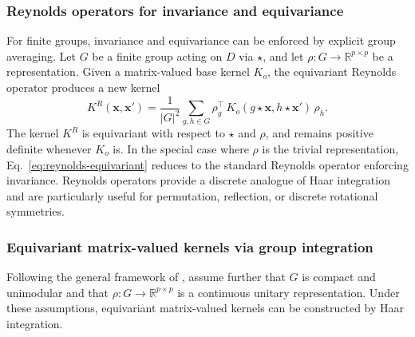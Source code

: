 \documentclass[11pt,a4paper]{article}
\newcommand{\Kbase}{K_o}
\newcommand{\bx}{\boldsymbol{x}}
\begin{document}
\subsubsection{Reynolds operators for invariance and equivariance}\label{subsec:Reynolds}
For finite groups, invariance and equivariance can be enforced by explicit group averaging.
Let $G$ be a finite group acting on $D$ via $\star$, and let $\rho : G \to \mathbb{R}^{p\times p}$ be a %
representation. %
Given a matrix-valued base kernel $\Kbase$, the equivariant Reynolds operator produces a new kernel
\begin{equation}\label{eq:reynolds-equivariant} K^{R}(\bx,\bx') = \frac{1}{|G|^2} \sum_{g,h\in G} \rho_g^{\top}\, \Kbase(g\star \bx, h\star \bx')\, \rho_h .\end{equation}
The kernel $K^{R}$ is equivariant with respect to $\star$ and $\rho$, and remains positive definite whenever $\Kbase$ is.
In the special case where $\rho$ is the trivial representation, Eq.~\eqref{eq:reynolds-equivariant} reduces to the standard
Reynolds operator enforcing invariance. Reynolds operators provide a discrete analogue of Haar integration and are particularly useful for permutation, reflection, or discrete rotational symmetries.

\subsubsection{Equivariant matrix-valued kernels via group integration}
Following the general framework of \cite{JMLR:v8:reisert07a}, assume further that $G$ is compact and unimodular and that $\rho : G \to \mathbb{R}^{p\times p}$ is a continuous unitary representation. Under these assumptions, equivariant matrix-valued kernels can be constructed by Haar integration.
\end{document}
